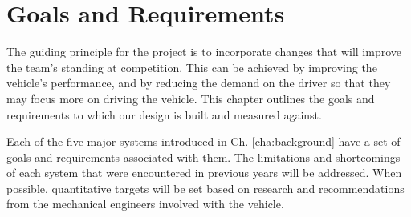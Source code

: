 \chapter{Goals and Requirements\label{cha:goals}}

The guiding principle for the project is to incorporate changes that will improve the team's standing at competition. This can be achieved by improving the vehicle's performance, and by reducing the demand on the driver so that they may focus more on driving the vehicle. This chapter outlines the goals and requirements to which our design is built and measured against.

Each of the five major systems introduced in Ch. \ref{cha:background} have a set of goals and requirements associated with them. The limitations and shortcomings of each system that were encountered in previous years will be addressed. When possible, quantitative targets will be set based on research and recommendations from the mechanical engineers involved with the vehicle.

%




